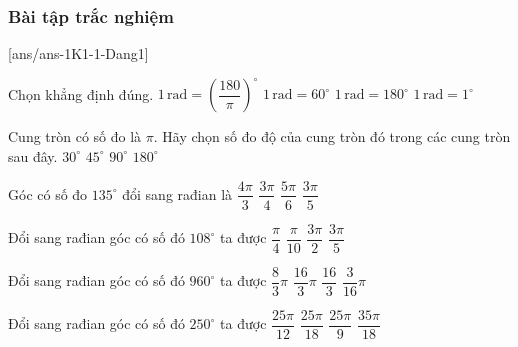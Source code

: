 \subsubsection{Bài tập trắc nghiệm}
[ans/ans-1K1-1-Dang1]
\begin{ex}%
	Chọn khẳng định đúng.
	\choice
	{\True $1\,\mathrm{rad}=\left(\dfrac{180}{\pi }\right)^\circ$}
	{$1\,\mathrm{rad}=60^\circ$}
	{$1\,\mathrm{rad}=180^\circ$}
	{$1\,\mathrm{rad}=1^\circ$}
\end{ex}
\begin{ex}%
	Cung tròn có số đo là $\pi$. Hãy chọn số đo độ của cung tròn đó trong các cung tròn sau đây.
	\choice
	{$30^{\circ}$}
	{$45^{\circ}$}
	{$90^{\circ}$}
	{\True $180^{\circ}$}
\end{ex}
\begin{ex}%
	Góc có số đo $135^{\circ}$ đổi sang rađian là
	\choice
	{$\dfrac{4\pi }{3}$}
	{\True $\dfrac{3\pi }{4}$}
	{$\dfrac{5\pi }{6}$}
	{$\dfrac{3\pi }{5}$}
\end{ex}
\begin{ex}%
	Đổi sang rađian góc có số đó $108^\circ$ ta được
	\choice
	{$\dfrac{\pi}{4}$}
	{$\dfrac{\pi}{10}$}
	{$\dfrac{3\pi}{2}$}
	{\True $\dfrac{3\pi}{5}$}
\end{ex}
\begin{ex}%
	Đổi sang rađian góc có số đó ${960}^{\circ}$ ta được
	\choice
	{$\dfrac{8}{3}\pi $}
	{\True $\dfrac{16}{3}\pi $}
	{$\dfrac{16}{3}$}
	{$\dfrac{3}{16}\pi $}
\end{ex}
\begin{ex}%
	Đổi sang rađian góc có số đó $250^\circ$ ta được
	\choice
	{\True $\dfrac{25\pi}{12}$}
	{$\dfrac{25\pi}{18}$}
	{$\dfrac{25\pi}{9}$}
	{$\dfrac{35\pi}{18}$}
\end{ex}
